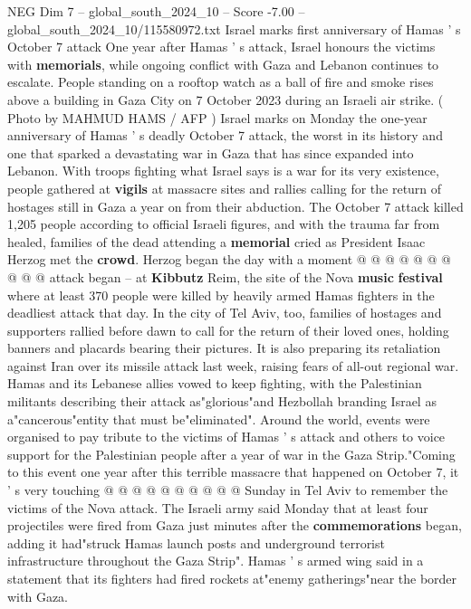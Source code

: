 \begin{textsample}{NEG Dim 7 – global\_south\_2024\_10 – Score -7.00 – global\_south\_2024\_10/115580972.txt}  \label{ex:f7_neg_245}
Israel marks first anniversary of Hamas ' s October 7 attack One year after Hamas ' s attack, Israel honours the victims with \textbf{memorials}, while ongoing conflict with Gaza and Lebanon continues to escalate.
People standing on a rooftop watch as a ball of fire and smoke rises above a building in Gaza City on 7 October 2023 during an Israeli air strike. ( Photo by MAHMUD HAMS / AFP ) Israel marks on Monday the one-year anniversary of Hamas ' s deadly October 7 attack, the worst in its history and one that sparked a devastating war in Gaza that has since expanded into Lebanon.
With troops fighting what Israel says is a war for its very existence, people gathered at \textbf{vigils} at massacre sites and rallies calling for the return of hostages still in Gaza a year on from their abduction.
The October 7 attack killed 1,205 people according to official Israeli figures, and with the trauma far from healed, families of the dead attending a \textbf{memorial} cried as President Isaac Herzog met the \textbf{crowd}.
Herzog began the day with a moment @ @ @ @ @ @ @ @ @ @ attack began -- at \textbf{Kibbutz} Reim, the site of the Nova \textbf{music} \textbf{festival} where at least 370 people were killed by heavily armed Hamas fighters in the deadliest attack that day.
In the city of Tel Aviv, too, families of hostages and supporters rallied before dawn to call for the return of their loved ones, holding banners and placards bearing their pictures.
It is also preparing its retaliation against Iran over its missile attack last week, raising fears of all-out regional war.
Hamas and its Lebanese allies vowed to keep fighting, with the Palestinian militants describing their attack as"glorious"and Hezbollah branding Israel as a"cancerous"entity that must be"eliminated".
Around the world, events were organised to pay tribute to the victims of Hamas ' s attack and others to voice support for the Palestinian people after a year of war in the Gaza Strip."Coming to this event one year after this terrible massacre that happened on October 7, it ' s very touching @ @ @ @ @ @ @ @ @ @ Sunday in Tel Aviv to remember the victims of the Nova attack.
The Israeli army said Monday that at least four projectiles were fired from Gaza just minutes after the \textbf{commemorations} began, adding it had"struck Hamas launch posts and underground terrorist infrastructure throughout the Gaza Strip".
Hamas ' s armed wing said in a statement that its fighters had fired rockets at"enemy gatherings"near the border with Gaza.

\end{textsample}
